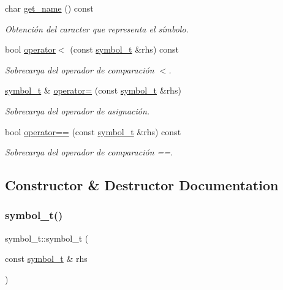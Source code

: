 \begin{DoxyCompactItemize}
char \hyperlink{classsymbol__t_a9b7b7463f33db34861590701a23a78bc}{get\+\_\+name} () const
\begin{DoxyCompactList}\small\item\em Obtención del caracter que representa el símbolo. \end{DoxyCompactList}\item 
bool \hyperlink{classsymbol__t_aeb4035229b7724a7394a97e9f3e5d8d7}{operator$<$} (const \hyperlink{classsymbol__t}{symbol\+\_\+t} \&rhs) const
\begin{DoxyCompactList}\small\item\em Sobrecarga del operador de comparación $<$. \end{DoxyCompactList}\item 
\hyperlink{classsymbol__t}{symbol\+\_\+t} \& \hyperlink{classsymbol__t_a28a877d02d2d132b42e41ae0a52230c7}{operator=} (const \hyperlink{classsymbol__t}{symbol\+\_\+t} \&rhs)
\begin{DoxyCompactList}\small\item\em Sobrecarga del operador de asignación. \end{DoxyCompactList}\item 
bool \hyperlink{classsymbol__t_a8b3f54fdd5cdea7dd7ff1a645933ed7f}{operator==} (const \hyperlink{classsymbol__t}{symbol\+\_\+t} \&rhs) const
\begin{DoxyCompactList}\small\item\em Sobrecarga del operador de comparación ==. \end{DoxyCompactList}\end{DoxyCompactItemize}


\subsection{Constructor \& Destructor Documentation}
\mbox{\label{classsymbol__t_a5963b7026ab86ce4d7f906129b513a2e}} 
\subsubsection{\texorpdfstring{symbol\+\_\+t()}{symbol\_t()}\hspace{0.1cm}{\footnotesize\ttfamily [1/2]}}
{\footnotesize\ttfamily symbol\+\_\+t\+::symbol\+\_\+t (\begin{DoxyParamCaption}\item[{const \hyperlink{classsymbol__t}{symbol\+\_\+t} \&}]{rhs }\end{DoxyParamCaption})}



